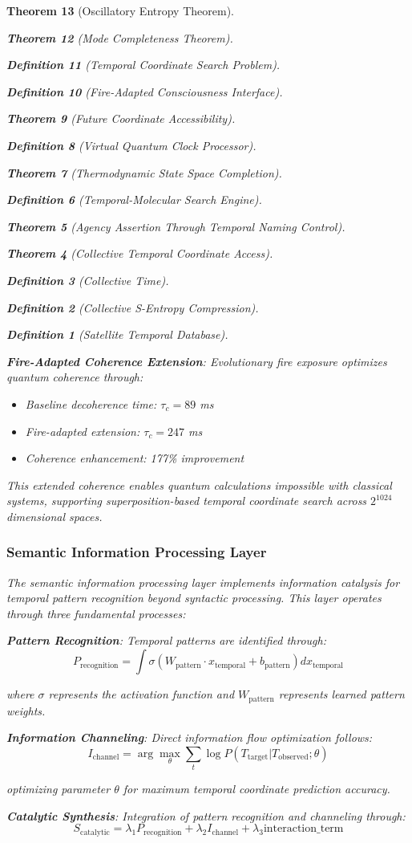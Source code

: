 \documentclass[12pt,a4paper]{article}
\newtheorem{theorem}{Theorem}[section]
\newtheorem{definition}[theorem]{Definition}
\begin{document}
\begin{theorem}[Oscillatory Entropy Theorem]
\begin{theorem}[Mode Completeness Theorem]
\begin{enumerate}
\begin{definition}[Temporal Coordinate Search Problem]
\begin{algorithm}
\begin{definition}[Fire-Adapted Consciousness Interface]
\begin{theorem}[Future Coordinate Accessibility]
\begin{definition}[Virtual Quantum Clock Processor]
\begin{itemize}
\begin{itemize}
\begin{theorem}[Thermodynamic State Space Completion]
\begin{definition}[Temporal-Molecular Search Engine]
\begin{theorem}[Agency Assertion Through Temporal Naming Control]
\begin{remark}
\begin{theorem}[Collective Temporal Coordinate Access]
\begin{definition}[Collective Time]
\begin{definition}[Collective S-Entropy Compression]
\begin{definition}[Satellite Temporal Database]
\begin{algorithm}
\begin{table}[h]
{\textbf{Fire-Adapted Coherence Extension}: Evolutionary fire exposure optimizes quantum coherence through:
\begin{itemize}
\item Baseline decoherence time: $\tau_c = 89$ ms
\item Fire-adapted extension: $\tau_c = 247$ ms
\item Coherence enhancement: 177\% improvement
\end{itemize}

This extended coherence enables quantum calculations impossible with classical systems, supporting superposition-based temporal coordinate search across $2^{1024}$ dimensional spaces.

\subsubsection{Semantic Information Processing Layer}

The semantic information processing layer implements information catalysis for temporal pattern recognition beyond syntactic processing. This layer operates through three fundamental processes:

\textbf{Pattern Recognition}: Temporal patterns are identified through:
$$P_{\text{recognition}} = \int \sigma(W_{\text{pattern}} \cdot x_{\text{temporal}} + b_{\text{pattern}}) dx_{\text{temporal}}$$

where $\sigma$ represents the activation function and $W_{\text{pattern}}$ represents learned pattern weights.

\textbf{Information Channeling}: Direct information flow optimization follows:
$$I_{\text{channel}} = \arg\max_\theta \sum_t \log P(T_{\text{target}}|T_{\text{observed}}; \theta)$$

optimizing parameter $\theta$ for maximum temporal coordinate prediction accuracy.

\textbf{Catalytic Synthesis}: Integration of pattern recognition and channeling through:
$$S_{\text{catalytic}} = \lambda_1 P_{\text{recognition}} + \lambda_2 I_{\text{channel}} + \lambda_3 \text{interaction\_term}$$

}
\end{table}
\end{algorithm}
\end{definition}
\end{definition}
\end{definition}
\end{theorem}
\end{remark}
\end{theorem}
\end{definition}
\end{theorem}
\end{itemize}
\end{itemize}
\end{definition}
\end{theorem}
\end{definition}
\end{algorithm}
\end{definition}
\end{enumerate}
\end{theorem}
\end{theorem}
\end{document}
